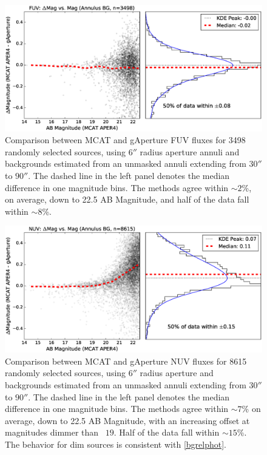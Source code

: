 \documentclass[preprint]{aastex}
\begin{document}
\begin{figure}
\includegraphics[scale=0.64]{Fig05.eps}
\caption{Comparison between MCAT and gAperture FUV fluxes for 3498 randomly selected sources, using $6''$ radius aperture annuli and backgrounds estimated from an unmasked annuli extending from $30''$ to $90''$. The dashed line in the left panel denotes the median difference in one magnitude bins. The methods agree within $\sim 2$\%, on average, down to 22.5 AB Magnitude, and half of the data fall within $\sim 8$\%.
\label{fuvrelphot}}
\end{figure}


\begin{figure}
\includegraphics[scale=0.64]{Fig06.eps}
\caption{Comparison between MCAT and gAperture NUV fluxes for 8615 randomly selected sources, using $6''$ radius aperture and backgrounds estimated from an unmasked annuli extending from $30''$ to $90''$. The dashed line in the left panel denotes the median difference in one magnitude bins. The methods agree within $\sim 7$\% on average, down to 22.5 AB Magnitude, with an increasing offset at magnitudes dimmer than ~$19$. Half of the data fall within $\sim 15$\%. The behavior for dim sources is consistent with \ref{bgrelphot}.
\label{nuvrelphot}}
\end{figure}
\end{document}

